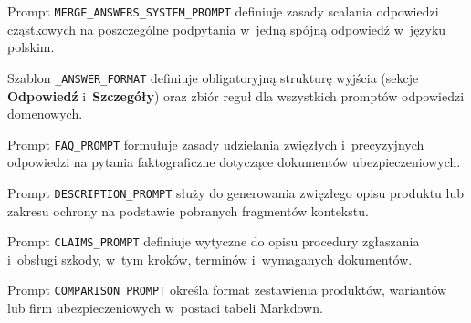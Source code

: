 

Prompt \texttt{MERGE\_ANSWERS\_SYSTEM\_PROMPT} definiuje zasady scalania
odpowiedzi cząstkowych na poszczególne podpytania w~jedną spójną odpowiedź
w~języku polskim.



Szablon \texttt{\_ANSWER\_FORMAT} definiuje obligatoryjną strukturę wyjścia
(sekcje \textbf{Odpowiedź} i~\textbf{Szczegóły}) oraz zbiór reguł dla
wszystkich promptów odpowiedzi domenowych.



Prompt \texttt{FAQ\_PROMPT} formułuje zasady udzielania zwięzłych
i~precyzyjnych odpowiedzi na pytania faktograficzne dotyczące dokumentów
ubezpieczeniowych.



Prompt \texttt{DESCRIPTION\_PROMPT} służy do generowania zwięzłego opisu
produktu lub zakresu ochrony na podstawie pobranych fragmentów kontekstu.



Prompt \texttt{CLAIMS\_PROMPT} definiuje wytyczne do opisu procedury zgłaszania
i~obsługi szkody, w~tym kroków, terminów i~wymaganych dokumentów.



Prompt \texttt{COMPARISON\_PROMPT} określa format zestawienia produktów,
wariantów lub firm ubezpieczeniowych w~postaci tabeli Markdown.


